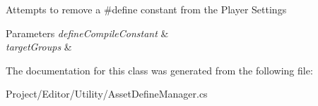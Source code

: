 Attempts to remove a \#define constant from the Player Settings 


\begin{DoxyParams}{Parameters}
{\em define\+Compile\+Constant} & \\
\hline
{\em target\+Groups} & \\
\hline
\end{DoxyParams}


The documentation for this class was generated from the following file\+:\begin{DoxyCompactItemize}
\item 
Project/\+Editor/\+Utility/Asset\+Define\+Manager.\+cs\end{DoxyCompactItemize}
